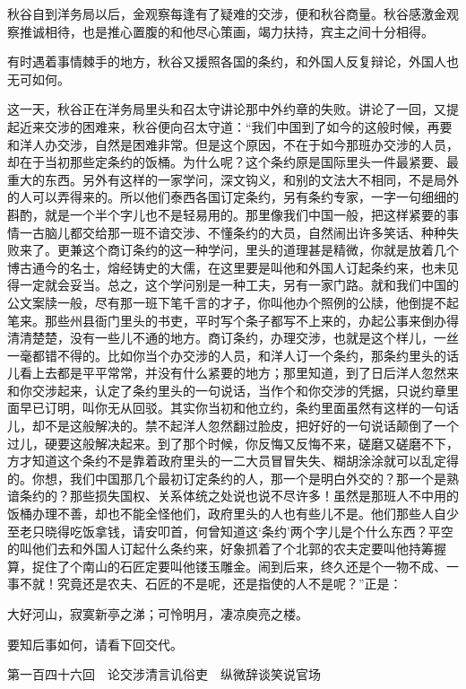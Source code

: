\documentclass[12pt,UTF8]{ctexbook}
\begin{document}
{{{秋谷自到洋务局以后，金观察每逢有了疑难的交涉，便和秋谷商量。秋谷感激金观察推诚相待，也是推心置腹的和他尽心策画，竭力扶持，宾主之间十分相得。

有时遇着事情棘手的地方，秋谷又援照各国的条约，和外国人反复辩论，外国人也无可如何。

这一天，秋谷正在洋务局里头和召太守讲论那中外约章的失败。讲论了一回，又提起近来交涉的困难来，秋谷便向召太守道：“我们中国到了如今的这般时候，再要和洋人办交涉，自然是困难非常。但是这个原因，不在于如今那班办交涉的人员，却在于当初那些定条约的饭桶。为什么呢？这个条约原是国际里头一件最紧要、最重大的东西。另外有这样的一家学问，深文钩义，和别的文法大不相同，不是局外的人可以弄得来的。所以他们泰西各国订定条约，另有条约专家，一字一句细细的斟酌，就是一个半个字儿也不是轻易用的。那里像我们中国一般，把这样紧要的事情一古脑儿都交给那一班不谙交涉、不懂条约的大员，自然闹出许多笑话、种种失败来了。更兼这个商订条约的这一种学问，里头的道理甚是精微，你就是放着几个博古通今的名士，熔经铸史的大儒，在这里要是叫他和外国人订起条约来，也未见得一定就会妥当。总之，这个学问别是一种工夫，另有一家门路。就和我们中国的公文案牍一般，尽有那一班下笔千言的才子，你叫他办个照例的公牍，他倒提不起笔来。那些州县衙门里头的书吏，平时写个条子都写不上来的，办起公事来倒办得清清楚楚，没有一些儿不通的地方。商订条约，办理交涉，也就是这个样儿，一丝一毫都错不得的。比如你当个办交涉的人员，和洋人订一个条约，那条约里头的话儿看上去都是平平常常，并没有什么紧要的地方；那里知道，到了日后洋人忽然来和你交涉起来，认定了条约里头的一句说话，当作个和你交涉的凭据，只说约章里面早已订明，叫你无从回驳。其实你当初和他立约，条约里面虽然有这样的一句话儿，却不是这般解决的。禁不起洋人忽然翻过脸皮，把好好的一句说话颠倒了一个过儿，硬要这般解决起来。到了那个时候，你反悔又反悔不来，磋磨又磋磨不下，方才知道这个条约不是靠着政府里头的一二大员冒冒失失、糊胡涂涂就可以乱定得的。你想，我们中国那几个最初订定条约的人，那一个是明白外交的？那一个是熟谙条约的？那些损失国权、关系体统之处说也说不尽许多！虽然是那班人不中用的饭桶办理不善，却也不能全怪他们，政府里头的人也有些儿不是。他们那些人自少至老只晓得吃饭拿钱，请安叩首，何曾知道这‘条约’两个字儿是个什么东西？平空的叫他们去和外国人订起什么条约来，好象抓着了个北郭的农夫定要叫他持筹握算，捉住了个南山的石匠定要叫他镂玉雕金。闹到后来，终久还是个一物不成、一事不就！究竟还是农夫、石匠的不是呢，还是指使的人不是呢？”正是：

大好河山，寂寞新亭之涕；可怜明月，凄凉庾亮之楼。

要知后事如何，请看下回交代。





第一百四十六回　论交涉清言讥俗吏　纵微辞谈笑说官场





}}}
\end{document}
